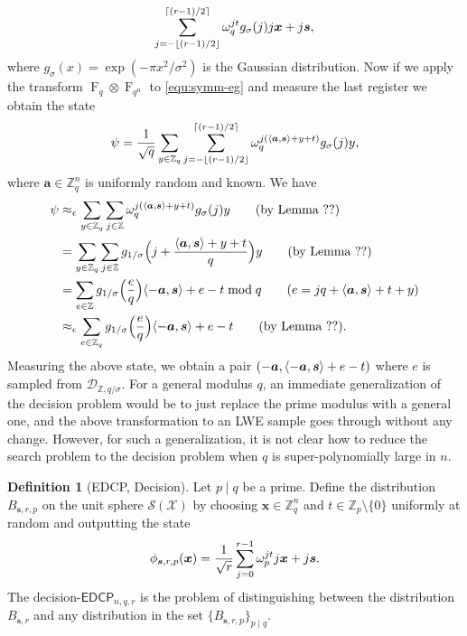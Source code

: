 \documentclass[11pt]{article}
\theoremstyle{plain}
\theoremstyle{definition}
\newtheorem{definition}[theorem]{Definition}
\DeclareMathOperator{\qft}{F}
\let\ket\relax
\DeclarePairedDelimiter{\ket}{\lvert}{\rangle}
\DeclarePairedDelimiter{\lrang}{\langle}{\rangle}
\def\Z{\mathbb{Z}}
\def\edcp{\mathsf{EDCP}}
\begin{document}
\begin{equation}
    \label{equ:symm-eg}
    \sum_{j = -\lfloor (r - 1) / 2 \rfloor}^{\lceil (r - 1) / 2 \rceil} \omega_q^{jt} g_\sigma(j) \ket{j}\ket{\bm{x} + j\bm{s}},
\end{equation}
where $g_\sigma(x) = \exp(-\pi x^2 / \sigma^2)$ is the Gaussian distribution. Now if we apply the transform $\qft_q \otimes \qft_{q^n}$ to \eqref{equ:symm-eg} and measure the last register we obtain the state
\[ \ket{\psi} =  \frac{1}{\sqrt{q}} \sum_{y \in \Z_q} \sum_{j = -\lfloor (r - 1) / 2 \rfloor}^{\lceil (r - 1) / 2 \rceil} \omega_q^{j(\lrang{\bm{a}, \bm{s}} + y + t)} g_\sigma(j) \ket{y},\]
where $\bm{a} \in \Z_q^n$ is uniformly random and known. We have
\begin{align*}
    \ket{\psi}
    & \approx_\epsilon \sum_{y \in \Z_q} \sum_{j \in \Z} \omega_q^{j(\lrang{\bm{a}, \bm{s}} + y + t)} g_\sigma(j) \ket{y} \tag{by Lemma ??} \\
    & = \sum_{y \in \Z_q} \sum_{j \in \Z} g_{1/\sigma} \Big( j + \frac{\lrang{\bm{a}, \bm{s}} + y + t}{q} \Big) \ket{y} \tag{by Lemma ??} \\
    & = \sum_{e \in \Z} g_{1/\sigma} \Big( \frac{e}{q} \Big) \ket{\lrang{-\bm{a}, \bm{s}} + e - t \bmod q} \tag{$e = jq + \lrang{\bm{a}, \bm{s}} + t + y$} \\
    & \approx_\epsilon \sum_{e \in \Z_q} g_{1/\sigma} \Big( \frac{e}{q} \Big) \ket{\lrang{-\bm{a}, \bm{s}} + e - t} \tag{by Lemma ??}.
\end{align*}
Measuring the above state, we obtain a pair $(-\bm{a}, \lrang{-\bm{a}, \bm{s}} + e - t)$ where $e$ is sampled from $\mathcal{D}_{\Z, q / \sigma}$. For a general modulus $q$, an immediate generalization of the decision problem would be to just replace the prime modulus with a general one, and the above transformation to an LWE sample goes through without any change. However, for such a generalization, it is not clear how to reduce the search problem to the decision problem when $q$ is super-polynomially large in $n$.
\begin{definition}[EDCP, Decision]
    Let $p \mid q$ be a prime. Define the distribution $B_{\bm{s}, r, p}$ on the unit sphere $\mathcal{S(X)}$ by choosing $\bm{x} \in \Z_q^n$ and $t \in \Z_p {\setminus} \{ 0 \}$ uniformly at random and outputting the state
    \begin{equation}
        \ket{
            \phi_{\bm{s}, r, p}(\bm{x})} = \frac{1}{\sqrt{r}} \sum_{j = 0}^{r - 1} \omega_p^{jt} \ket{j}\ket{\bm{x} + j\bm{s}}.
    \end{equation}
    The decision-$\edcp_{n, q, r}$ is the problem of distinguishing between the distribution $B_{\bm{s}, r}$ and any distribution in the set $\{ B_{\bm{s}, r, p} \}_{p \mid q}$.
\end{definition}
\end{document}

